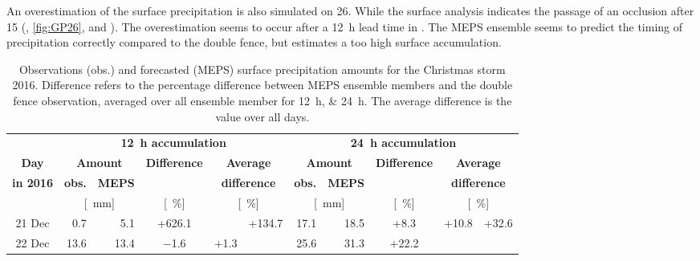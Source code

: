 An overestimation of the surface precipitation is also simulated on \SI{26}{\dec}. While the surface analysis indicates the passage of an occlusion after \SI{15}{\UTC} (, \ref{fig:GP26}, and ). The overestimation seems to occur after a \SI{12}{\hour} lead time in . 
The MEPS ensemble seems to predict the timing of precipitation correctly compared to the double fence, but estimates a too high surface accumulation.
\begin{table}[t]
	\begin{center}
		\caption{Observations (obs.) and forecasted (MEPS) surface precipitation amounts for the Christmas storm 2016. Difference refers to the percentage difference between MEPS ensemble members and the double fence observation, averaged over all ensemble member for \SIlist{12;24}{\hour}. The average difference is the value over all days.}\label{tab:res:MEPS_err}
		\begin{tabular}{c||r|r|c|c|c||r|r|c|c|c}
			\hline \hline
			& \multicolumn{5}{c||}{\textbf{\SI{12}{\hour} accumulation}} & \multicolumn{5}{c}{\textbf{\SI{24}{\hour} accumulation}}    \\ \cline{2-11}
			\textbf{Day} & \multicolumn{2}{c|}{\textbf{Amount}} & \textbf{Difference} & \multicolumn{2}{c||}{\textbf{Average}} &  \multicolumn{2}{c|}{\textbf{Amount}} & \textbf{Difference} & \multicolumn{2}{c}{\textbf{Average}}  \\\cline{2-3} \cline{7-8}
			\textbf{in 2016} & \textbf{obs.} & \textbf{MEPS} & & \multicolumn{2}{c||}{\textbf{difference}} & \textbf{obs.} & \textbf{MEPS} & & \multicolumn{2}{c}{\textbf{difference}} \\\cline{2-11}
			& \multicolumn{2}{c|}{[\SI{}{\mm}]} & [\SI{}{\percent}] & \multicolumn{2}{c||}{ [\SI{}{\percent}]} & \multicolumn{2}{c|}{[\SI{}{\mm}]} & [\SI{}{\percent}] & \multicolumn{2}{c}{ [\SI{}{\percent}]} \\ \hline\hline
			\num{21} Dec & \num{0.7} & \num{5.1} & +\num{626.1} &  &\multirow{6}{*}{+\num{134.7}} & \num{17.1} & \num{18.5} & +\num{8.3} & \multirow{3}{*}{+\num{10.8}}& \multirow{6}{*}{+\num{32.6}}   \\\cline{1-5}\cline{7-9} 
			\num{22} Dec & \num{13.6} & \num{13.4} & \num{-1.6} & \multirow{2}{*}{+\num{1.3}} & & \num{25.6} & \num{31.3} & +\num{22.2} &  &  \\\cline{1-4}\cline{7-9}

\end{tabular}
\end{center}
\end{table}
